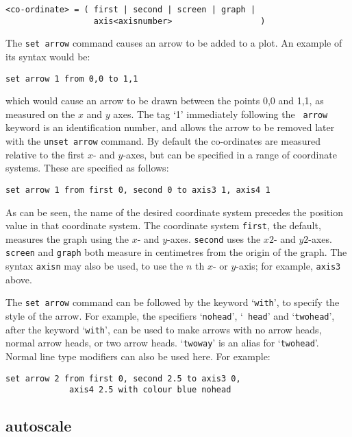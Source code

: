 \documentclass[a4paper,onecolumn,11pt]{book}
\begin{document}
\begin{verbatim}
<co-ordinate> = ( first | second | screen | graph |
                  axis<axisnumber>                  )
\end{verbatim}

The {\tt set arrow} command causes an arrow to be added to a plot. An example of
its syntax would be:

\begin{verbatim}
set arrow 1 from 0,0 to 1,1
\end{verbatim}

\noindent which would cause an arrow to be drawn between the points 0,0 and 1,1, as
measured on the $x$ and $y$ axes.  The tag `1' immediately following the {\tt
arrow} keyword is an identification number, and allows the arrow to be removed
later with the {\tt unset arrow} command.  By default the co-ordinates are
measured relative to the first $x$- and $y$-axes, but can be specified in a range
of coordinate systems. These are specified as follows:

\begin{verbatim}
set arrow 1 from first 0, second 0 to axis3 1, axis4 1
\end{verbatim}

As can be seen, the name of the desired coordinate system precedes the position
value in that coordinate system. The coordinate system {\tt first}, the default,
measures the graph using the $x$- and $y$-axes. {\tt second} uses the $x2$- and
$y2$-axes.  {\tt screen} and {\tt graph} both measure in centimetres from the
origin of the graph.  The syntax {\tt axisn} may also be
used, to use the $n$ th $x$- or $y$-axis; for example, {\tt axis3} above.

The {\tt set arrow} command can be followed by the keyword `{\tt with}', to
specify the style of the arrow. For example, the specifiers `{\tt nohead}', `{\tt
head}' and `{\tt twohead}', after the keyword `{\tt with}', can be used to make
arrows with no arrow heads, normal arrow heads, or two arrow heads. `{\tt twoway}'
is an alias for `{\tt twohead}'.  Normal line type modifiers can also be used
here.  For example:

\begin{verbatim}
set arrow 2 from first 0, second 2.5 to axis3 0,
             axis4 2.5 with colour blue nohead
\end{verbatim}



\subsection{autoscale}
\end{document}
